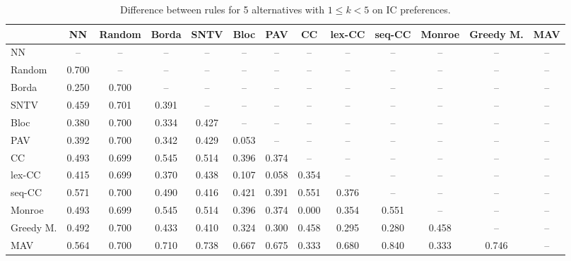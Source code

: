 
\begin{table*}[h!]
\centering
\begin{tabular}{lcccccccccccc}
\toprule
 & NN & Random & Borda & SNTV & Bloc & PAV & CC & lex-CC & seq-CC & Monroe & Greedy M. & MAV \\
\midrule
NN & -- & -- & -- & -- & -- & -- & -- & -- & -- & -- & -- & -- \\
Random & 0.700 & -- & -- & -- & -- & -- & -- & -- & -- & -- & -- & -- \\
Borda & 0.250 & 0.700 & -- & -- & -- & -- & -- & -- & -- & -- & -- & -- \\
SNTV & 0.459 & 0.701 & 0.391 & -- & -- & -- & -- & -- & -- & -- & -- & -- \\
Bloc & 0.380 & 0.700 & 0.334 & 0.427 & -- & -- & -- & -- & -- & -- & -- & -- \\
PAV & 0.392 & 0.700 & 0.342 & 0.429 & 0.053 & -- & -- & -- & -- & -- & -- & -- \\
CC & 0.493 & 0.699 & 0.545 & 0.514 & 0.396 & 0.374 & -- & -- & -- & -- & -- & -- \\
lex-CC & 0.415 & 0.699 & 0.370 & 0.438 & 0.107 & 0.058 & 0.354 & -- & -- & -- & -- & -- \\
seq-CC & 0.571 & 0.700 & 0.490 & 0.416 & 0.421 & 0.391 & 0.551 & 0.376 & -- & -- & -- & -- \\
Monroe & 0.493 & 0.699 & 0.545 & 0.514 & 0.396 & 0.374 & 0.000 & 0.354 & 0.551 & -- & -- & -- \\
Greedy M. & 0.492 & 0.700 & 0.433 & 0.410 & 0.324 & 0.300 & 0.458 & 0.295 & 0.280 & 0.458 & -- & -- \\
MAV & 0.564 & 0.700 & 0.710 & 0.738 & 0.667 & 0.675 & 0.333 & 0.680 & 0.840 & 0.333 & 0.746 & -- \\
\bottomrule
\end{tabular}

\caption{Difference between rules for 5 alternatives with $1 \leq k < 5$ on IC preferences.}
\end{table*}
